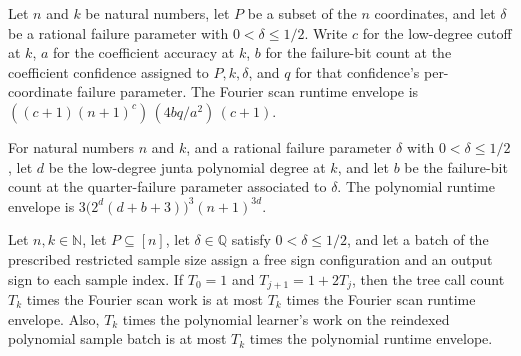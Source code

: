 \begin{definition}
\label{FABL.lowDegreeJuntaFourierScanRuntimeEnvelope}
\leanok
{}
Let $n$ and $k$ be natural numbers, let $P$ be a subset of the $n$ coordinates, and let
$\delta$ be a rational failure parameter with $0<\delta\leq 1/2$. Write $c$ for the
low-degree cutoff at $k$, $a$ for the coefficient accuracy at $k$, $b$ for the
failure-bit count at the coefficient confidence assigned to $P,k,\delta$, and $q$ for
that confidence's per-coordinate failure parameter. The Fourier scan runtime envelope is
$((c+1)(n+1)^c)\, (4bq/a^2)\, (c+1)$.
\end{definition}

\begin{definition}
\label{FABL.lowDegreeJuntaPolynomialRuntimeEnvelope}
\leanok
{}
For natural numbers $n$ and $k$, and a rational failure parameter $\delta$ with
$0<\delta\leq 1/2$, let $d$ be the low-degree junta polynomial degree at $k$, and let
$b$ be the failure-bit count at the quarter-failure parameter associated to $\delta$.
The polynomial runtime envelope is $3\bigl(2^d(d+b+3)\bigr)^3(n+1)^{3d}$.
\end{definition}

\begin{theorem}
\label{FABL.lowDegreeJuntaNodeRuntimeLedger_mul_treeCallCount}
\leanok
{}
Let $n,k\in\mathbb N$, let $P\subseteq[n]$, let $\delta\in\mathbb Q$ satisfy
$0<\delta\le1/2$, and let a batch of the prescribed restricted sample size assign a free
sign configuration and an output sign to each sample index. If $T_0=1$ and
$T_{j+1}=1+2T_j$, then the tree call count $T_k$ times the Fourier scan work is at most
$T_k$ times the Fourier scan runtime envelope. Also, $T_k$ times the polynomial
learner's work on the reindexed polynomial sample batch is at most $T_k$ times the
polynomial runtime envelope.
\end{theorem}

